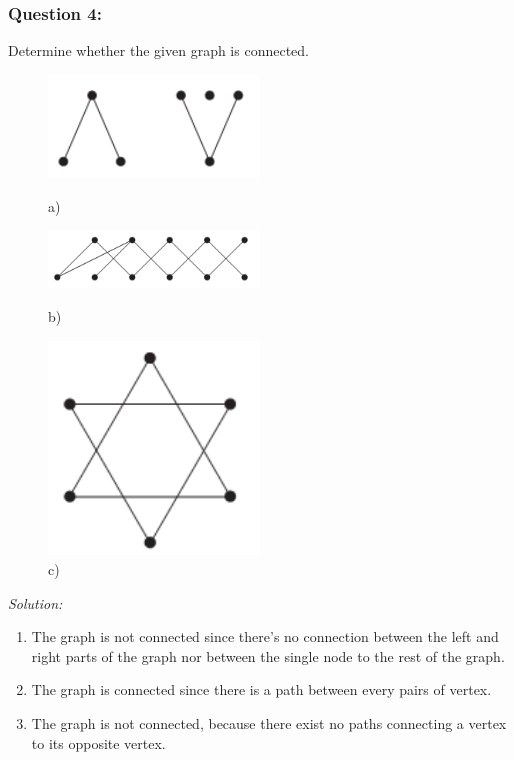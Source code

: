 \documentclass[a4paper]{article}
\begin{document}
	\subsubsection*{Question 4:}
	Determine whether the given graph is connected.
	\begin{figure}[H]
		\begin{minipage}{0.3\textwidth}
			\centering
			\includegraphics[width=0.5\textwidth]{tut94_1.png}
			\caption*{a)}
		\end{minipage}
		\begin{minipage}{0.3\textwidth}
			\centering
			\includegraphics[width=0.5\textwidth]{tut94_2.png}
			\caption*{b)}
		\end{minipage}
		\begin{minipage}{0.3\textwidth}
			\centering
			\includegraphics[width=0.5\textwidth]{tut94_3.png}
			\caption*{c)}
		\end{minipage}
	\end{figure}
	\textit{Solution:}
	\begin{enumerate}[label = \alph*)]
	    \item 
    	The graph is not connected since there's no connection between the left and right parts of the graph nor between the single node to the rest of the graph.
    	\item 
    	The graph is connected since there is a path between every pairs of vertex.
    	\item 
        The graph is not connected, because there exist no paths connecting a vertex to its opposite vertex.
	\end{enumerate}
\end{document}
